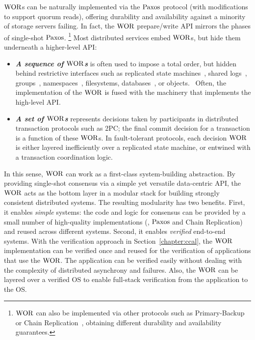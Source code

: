 $\mathrm{WOR}$s can be naturally implemented via the $\mathrm{Paxos}$ protocol (with modifications to support quorum reads), 
offering durability and availability against a minority of storage servers failing. 
In fact, the $\mathrm{WOR}$  prepare/write API mirrors the phases of single-shot $\mathrm{Paxos}$. 
\footnote{$\mathrm{WOR}$ can also be implemented via other protocols such as Primary-Backup or Chain Replication~\cite{chainreplication}, 
obtaining different durability and availability guarantees.}
Most distributed services embed $\mathrm{WOR}$s, but hide them underneath a higher-level API:

\begin{itemize}
\item \textbf{\textit{A sequence of $\mathrm{WOR}$s}} is often used to impose a total order, but hidden behind restrictive interfaces such as replicated state machines~\cite{smr, rvrpaxos}, shared logs~\cite{corfu}, groups~\cite{GC, horus}, namespaces~\cite{chubby, zookeeper}, filesystems, databases~\cite{hyder}, or objects.~\cite{tango} Often, the implementation of the $\mathrm{WOR}$ is fused with the machinery that implements the high-level API.

\item \textbf{\textit{A set of $\mathrm{WOR}$s}} represents decisions taken by participants in distributed transaction protocols such as 2PC; the final commit decision for a transaction is a function of these $\mathrm{WOR}$s. In fault-tolerant protocols, each decision $\mathrm{WOR}$ is either layered inefficiently over a replicated state machine, or entwined with a transaction coordination logic.~\cite{gray:2006}
\end{itemize}

In this sense, $\mathrm{WOR}$ can work as a first-class system-building abstraction.
 By providing single-shot consensus via a simple yet versatile data-centric API, 
 the $\mathrm{WOR}$ acts as the bottom layer in a modular stack for building strongly consistent distributed systems. 
 The resulting modularity has two benefits.
 First, it enables \textit{simple} systems: the code and logic for consensus can be provided by a small number of high-quality implementations
  (\eg, $\mathrm{Paxos}$ and Chain Replication) and reused across different systems. 
  Second, it enables \textit{verified} end-to-end systems.
   With the verification approach in Section~\ref{chapter:ccal}, 
  the $\mathrm{WOR}$ implementation can be verified once and reused for the verification of applications that use the $\mathrm{WOR}$.
   The application can be verified easily without dealing with the complexity of distributed asynchrony and failures. 
   Also, the $\mathrm{WOR}$ can be layered over a verified OS to enable full-stack verification from the application to the OS. 

